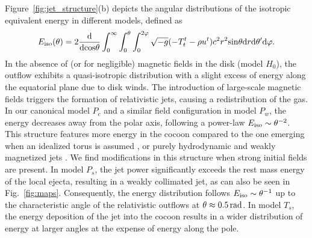 \documentclass[twocolumn,dvipsnames]{aastex62}
\begin{document}
Figure~\ref{fig:jet_structure}(b) depicts the angular distributions of the isotropic equivalent energy in different models, defined as
\begin{equation}
    E_{\rm iso}(\theta) = 2\frac{\mathrm{d}}{\mathrm{d}{\rm cos}\theta}\int_0^\infty\int_0^\theta\int_0^{2\varphi}\sqrt{-g}(-T^t_t - \rho u^t)c^2r^2{\rm sin}\theta\mathrm{d}r\mathrm{d}\theta'\mathrm{d}\varphi.
\end{equation}
In the absence of (or for negligible) magnetic fields in the disk (model $ H_0 $), the outflow exhibits a quasi-isotropic distribution with a slight excess of energy along the equatorial plane due to disk winds. The introduction of large-scale magnetic fields triggers the formation of relativistic jets, causing a redistribution of the gas. In our canonical model $ P_c $ and a similar field configuration in model $ P_w $, the energy decreases away from the polar axis, following a power-law $ E_{\rm iso} \sim \theta^{-2} $. This structure features more energy in the cocoon compared to the one emerging when an idealized torus is assumed \citep[model $ V $ in][]{Gottlieb2022d}, or purely hydrodynamic and weakly magnetized jets \citep{Gottlieb2020b,Gottlieb2021a}. We find modifications in this structure when strong initial fields are present. In model $ P_s $, the jet power significantly exceeds the rest mass energy of the local ejecta, resulting in a weakly collimated jet, as can also be seen in Fig.~\ref{fig:maps}. Consequently, the energy distribution follows $ E_{\rm iso} \sim \theta^{-1} $ up to the characteristic angle of the relativistic outflows at $ \theta \approx 0.5\,{\rm rad} $. In model $ T_s $, the energy deposition of the jet into the cocoon results in a wider distribution of energy at larger angles at the expense of energy along the pole.
\end{document}
